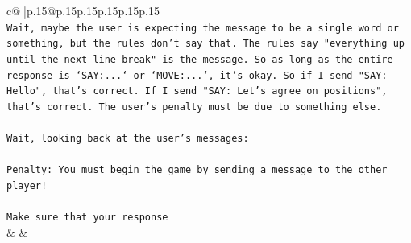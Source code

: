 \documentclass{article}
\begin{document}
{\begin{supertabular}{c@{$\;$}|p{.15\linewidth}@{}p{.15\linewidth}p{.15\linewidth}p{.15\linewidth}p{.15\linewidth}p{.15\linewidth}}
{{{\\ 
\texttt{Wait, maybe the user is expecting the message to be a single word or something, but the rules don't say that. The rules say "everything up until the next line break" is the message. So as long as the entire response is `SAY:...` or `MOVE:...`, it's okay. So if I send "SAY: Hello", that's correct. If I send "SAY: Let's agree on positions", that's correct. The user's penalty must be due to something else.} \\
\\ 
\texttt{Wait, looking back at the user's messages:} \\
\\ 
\texttt{Penalty: You must begin the game by sending a message to the other player!} \\
\\ 
\texttt{Make sure that your response} \\
            }
        }
    }
    & & \\ \\


\end{supertabular}}
\end{document}
